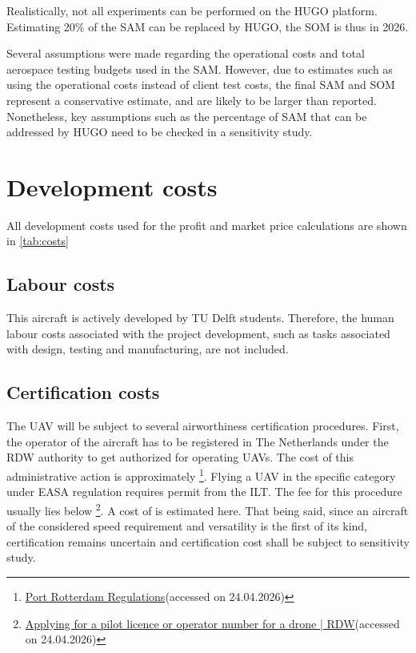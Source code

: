 Realistically, not all experiments can be performed on the HUGO platform. Estimating 20\% of the SAM can be replaced by HUGO, the SOM is thus  in 2026.

Several assumptions were made regarding the operational costs and total aerospace testing budgets used in the SAM. However, due to estimates such as using the operational costs instead of client test costs, the final SAM and SOM represent a conservative estimate, and are likely to be larger than reported. Nonetheless, key assumptions such as the percentage of SAM that can be addressed by HUGO need to be checked in a sensitivity study.

\section{Development costs}
All development costs used for the profit and market price calculations are shown in \autoref{tab:costs}
\subsection{Labour costs}
This aircraft is actively developed by TU Delft students. Therefore, the human labour costs associated with the project development, such as tasks associated with design, testing and manufacturing, are not included.

\subsection{Certification costs}
The UAV will be subject to several airworthiness certification procedures. First, the operator of the aircraft has to be registered in The Netherlands under the RDW authority to get authorized for operating UAVs. The cost of this administrative action is approximately  \footnote{\href{https://www.portofrotterdam.com/sites/default/files/2025-07/regulation-and-permit-application-drones.pdf}{Port Rotterdam Regulations}(accessed on 24.04.2026)}. Flying a UAV in the specific category under EASA regulation requires permit from the ILT. The fee for this procedure usually lies below  \footnote{\href{https://www.rdw.nl/en/drone/applying-for-a-pilot-licence-or-operator-number-for-a-drone}{Applying for a pilot licence or operator number for a drone | RDW}(accessed on 24.04.2026)}. A cost of  is estimated here. That being said, since an aircraft of the considered speed requirement and versatility is the first of its kind, certification remains uncertain and certification cost shall be subject to sensitivity study.

